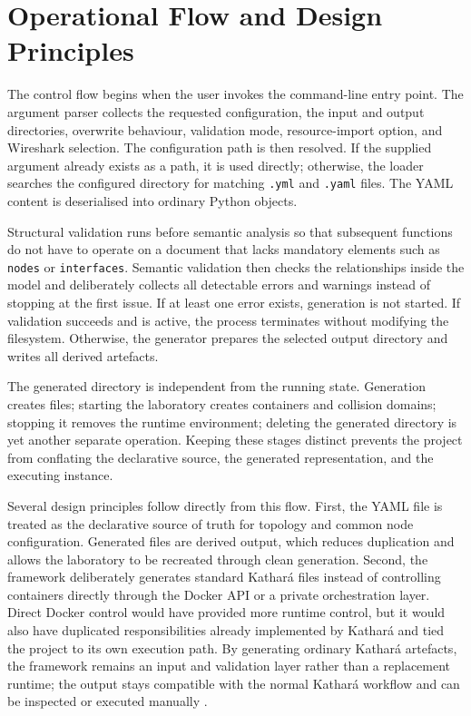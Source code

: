 \section{Operational Flow and Design Principles}
\label{sec:operational-flow-design}

The control flow begins when the user invokes the command-line entry point.
The argument parser collects the requested configuration, the input and output
directories, overwrite behaviour, validation mode, resource-import option, and
Wireshark selection. The configuration path is then resolved. If the supplied
argument already exists as a path, it is used directly; otherwise, the loader
searches the configured directory for matching \texttt{.yml} and
\texttt{.yaml} files. The YAML content is deserialised into ordinary Python
objects.

Structural validation runs before semantic analysis so that subsequent
functions do not have to operate on a document that lacks mandatory elements
such as \texttt{nodes} or \texttt{interfaces}. Semantic validation then checks
the relationships inside the model and deliberately collects all detectable
errors and warnings instead of stopping at the first issue. If at least one
error exists, generation is not started. If validation succeeds and
 is active, the process terminates without modifying
the filesystem. Otherwise, the generator prepares the selected output
directory and writes all derived artefacts.

The generated directory is independent from the running state. Generation
creates files; starting the laboratory creates containers and collision
domains; stopping it removes the runtime environment; deleting the generated
directory is yet another separate operation. Keeping these stages distinct
prevents the project from conflating the declarative source, the generated
representation, and the executing instance.

Several design principles follow directly from this flow. First, the YAML
file is treated as the declarative source of truth for topology and common
node configuration. Generated files are derived output, which reduces
duplication and allows the laboratory to be recreated through clean
generation. Second, the framework deliberately generates standard Kathar\'a
files instead of controlling containers directly through the Docker API or a
private orchestration layer. Direct Docker control would have provided more
runtime control, but it would also have duplicated responsibilities already
implemented by Kathar\'a and tied the project to its own execution path. By
generating ordinary Kathar\'a artefacts, the framework remains an input and
validation layer rather than a replacement runtime; the output stays
compatible with the normal Kathar\'a workflow and can be inspected or executed
manually \cite{kathara_manpage}.

